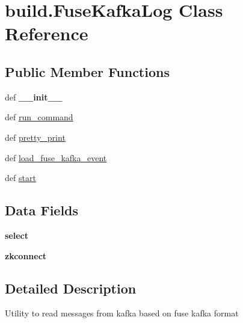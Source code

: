 \hypertarget{classbuild_1_1FuseKafkaLog}{\section{build.\-Fuse\-Kafka\-Log \-Class \-Reference}
\label{classbuild_1_1FuseKafkaLog}
}
\subsection*{\-Public \-Member \-Functions}
\begin{DoxyCompactItemize}
\item 
\hypertarget{classbuild_1_1FuseKafkaLog_a2f38cc2ad0ba6471725a2b07ca0d8c9d}{def {\bfseries \-\_\-\-\_\-init\-\_\-\-\_\-}}\label{classbuild_1_1FuseKafkaLog_a2f38cc2ad0ba6471725a2b07ca0d8c9d}

\item 
def \hyperlink{classbuild_1_1FuseKafkaLog_ab32a24d28f6d70a85fdd010de42e4b92}{run\-\_\-command}
\item 
def \hyperlink{classbuild_1_1FuseKafkaLog_a2f482d5c0fae01448b3e9014af3f046e}{pretty\-\_\-print}
\item 
def \hyperlink{classbuild_1_1FuseKafkaLog_a0aee00e8760ca9f8fb4b45b87bde5c14}{load\-\_\-fuse\-\_\-kafka\-\_\-event}
\item 
def \hyperlink{classbuild_1_1FuseKafkaLog_a88eb29c1007677e7ae6e92e8adb80b9e}{start}
\end{DoxyCompactItemize}
\subsection*{\-Data \-Fields}
\begin{DoxyCompactItemize}
\item 
\hypertarget{classbuild_1_1FuseKafkaLog_a59a9a6be5d7a9b6bb73c75fafabf3b8f}{{\bfseries select}}\label{classbuild_1_1FuseKafkaLog_a59a9a6be5d7a9b6bb73c75fafabf3b8f}

\item 
\hypertarget{classbuild_1_1FuseKafkaLog_a4459ad2364f435ec006a35373169bc8b}{{\bfseries zkconnect}}\label{classbuild_1_1FuseKafkaLog_a4459ad2364f435ec006a35373169bc8b}

\end{DoxyCompactItemize}


\subsection{\-Detailed \-Description}
\begin{DoxyVerb}Utility to read messages from kafka based on fuse kafka format \end{DoxyVerb}
 


